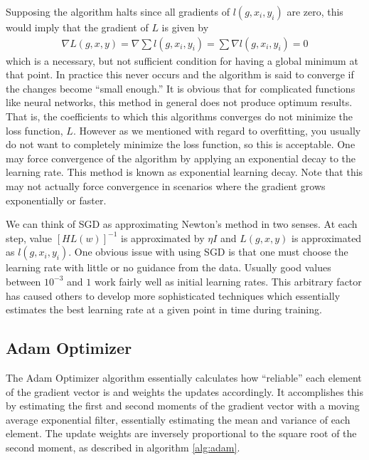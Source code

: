 Supposing the algorithm halts since all gradients of $l(g,x_i,y_i)$ are zero, this would imply that the gradient of $L$ is given by
\begin{align}
\nabla L(g,x,y) = \nabla \sum l(g,x_i,y_i) = \sum \nabla l(g,x_i,y_i) = 0
\end{align}
 which is a necessary, but not sufficient condition for having a global minimum at that point.  In practice this never occurs and the algorithm is said to converge if the changes become ``small enough.''  It is obvious that for complicated functions like neural networks, this method in general does not produce optimum results.  That is, the coefficients to which this algorithms converges do not minimize the loss function, $L$.  However as we mentioned with regard to overfitting, you usually do not want to completely minimize the loss function, so this is acceptable.  One may force convergence of the algorithm by applying an exponential decay to the learning rate.  This method is known as exponential learning decay.  Note that this may not actually force convergence in scenarios where the gradient grows exponentially or faster.  

We can think of SGD as approximating Newton's method in two senses.  At each step, value $[HL(w)]^{-1}$ is approximated by $\eta I$ and $L(g,x,y)$ is approximated as $l(g,x_i,y_i)$.  One obvious issue with using SGD is that one must choose the learning rate with little or no guidance from the data.  Usually good values between $10^{-3}$ and $1$ work fairly well as initial learning rates.  This arbitrary factor has caused others to develop more sophisticated techniques which essentially estimates the best learning rate at a given point in time during training.

\subsection{Adam Optimizer}
The Adam Optimizer algorithm \cite{pd14} essentially calculates how ``reliable'' each element of the gradient vector is and weights the updates accordingly.  It accomplishes this by estimating the first and second moments of the gradient vector with a moving average exponential filter, essentially estimating the mean and variance of each element.  The update weights are inversely proportional to the square root of the second moment, as described in algorithm \ref{alg:adam}.

